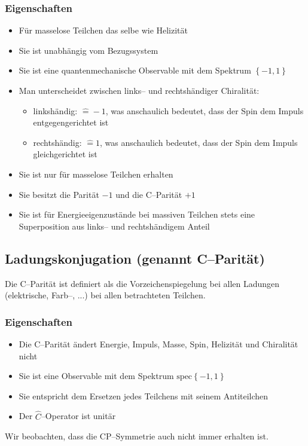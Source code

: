 \documentclass[Ex4_Zusammenfassung.tex]{subfiles}
\begin{document}
\subsubsection{Eigenschaften}
\begin{itemize}
	\item Für masselose Teilchen das selbe wie Helizität
	\item Sie ist unabhängig vom Bezugssystem
	\item Sie ist eine quantenmechanische Observable mit dem Spektrum $\left\{ -1, 1\right\}$
	\item Man unterscheidet zwischen links-- und rechtshändiger Chiralität: 
		\begin{itemize}
			\item linkshändig: $\hat{=} -1$, was anschaulich bedeutet, dass der Spin dem Impuls entgegengerichtet ist
			\item rechtshändig: $\hat{=} 1$, was anschaulich bedeutet, dass der Spin dem Impuls gleichgerichtet ist
		\end{itemize}
	\item Sie ist nur für masselose Teilchen erhalten
	\item Sie besitzt die Parität $-1$ und die C--Parität $+1$
	\item Sie ist für Energieeigenzustände bei massiven Teilchen stets eine Superposition aus links-- und rechtshändigem Anteil
\end{itemize}


\subsection{Ladungskonjugation (genannt C--Parität)}
Die C--Parität ist definiert als die Vorzeichenspiegelung bei allen Ladungen (elektrische, Farb--, ...) bei allen betrachteten Teilchen. 

\subsubsection{Eigenschaften}
\begin{itemize}
	\item Die C--Parität ändert Energie, Impuls, Masse, Spin, Helizität und Chiralität nicht
	\item Sie ist eine Observable mit dem Spektrum $\mathrm{spec}\left\{ -1, 1\right\}$
	\item Sie entspricht dem Ersetzen jedes Teilchens mit seinem Antiteilchen
	\item Der $\hat{C}$--Operator ist unitär
\end{itemize}
Wir beobachten, dass die CP--Symmetrie auch nicht immer erhalten ist. 
\end{document}
